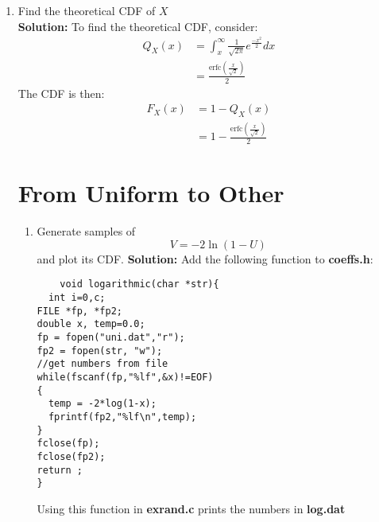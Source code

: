 \documentclass[journal,12pt,twocolumn]{IEEEtran}
\newcommand{\solution}{\noindent \textbf{Solution: }}
\providecommand{\brak}[1]{\ensuremath{\left(#1\right)}}
\numberwithin{equation}{section}
\renewcommand\thesection{\arabic{section}}
\begin{document}
\begin{enumerate}[label=\thesection.\arabic*
,ref=\thesection.\theenumi]
\begin{align}
    E[X^2] &=  \int_{-\infty}^{\infty} \frac{x^2}{\sqrt{2\pi}}\exp{\left(-\frac{x^2}{2}\right)} \\
    &= -\frac{x}{\sqrt{2\pi}}e^{\brak{-\frac{x^2}{2}}} \Bigg{|}_{-\infty}^{\infty} + \int_{-\infty}^{\infty} \frac{1}{\sqrt{2\pi}}e^{\brak{-\frac{x^2}{2}}}   \\
    &= 0 + \frac{1}{\sqrt{2\pi}} \times \sqrt{2\pi} \\
    &= 1
\end{align}
Hence, 
\begin{align}
    \text{var}(X) &= E[X^2] - E[X]^2 \\ 
    &= 1 
\end{align}
Therefore, the mean is $0$ and the variance is $1$. Running the empirical code in \textbf{./Code/exrand.c}, 
   we get mean = $0.000685$ and variance = $1.000025$, which closely matches the theoretical values.
   

\item Find the theoretical CDF of $X$
\\
\solution
 To find the theoretical CDF, consider:
\begin{align}
    Q_X(x) &= \int_x ^{\infty} \frac{1}{\sqrt{2\pi}} e^{\frac{-x^2}{2}} dx \\
      &= \frac{\text{erfc}(\frac{x}{\sqrt{2}})}{2}
   \end{align}
The CDF is then:
\begin{align}
    F_X(x) &= 1 - Q_X(x) \\
    &= 1 - \frac{\text{erfc}(\frac{x}{\sqrt{2}})}{2}
\end{align}

\section{From Uniform to Other}
\begin{enumerate}[label=\thesection.\arabic*
,ref=\thesection.\theenumi]
%
\item
Generate samples of 
%
\begin{equation}
V = -2\ln\brak{1-U}
\end{equation}
%
and plot its CDF.  
\solution 
Add the following function to \textbf{coeffs.h}:
\begin{lstlisting}
    void logarithmic(char *str){
  int i=0,c;
FILE *fp, *fp2;
double x, temp=0.0;
fp = fopen("uni.dat","r");
fp2 = fopen(str, "w");
//get numbers from file
while(fscanf(fp,"%lf",&x)!=EOF)
{
  temp = -2*log(1-x);
  fprintf(fp2,"%lf\n",temp);
}
fclose(fp);
fclose(fp2);
return ;
}
    \end{lstlisting}
Using this function in \textbf{exrand.c} prints the numbers in 
\textbf{log.dat} 



\end{enumerate}
\end{enumerate}
\end{document}
